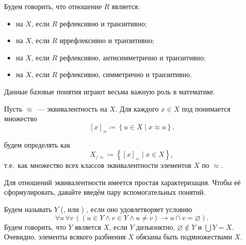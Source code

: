 \begin{definition*}
    Будем говорить, что отношение $R$ является:
    \begin{itemize}
        \item {} на $X$, если $R$ рефлексивно и транзитивно;
        \item {} на $X$, если $R$ иррефлексивно и транзитивно;
        \item {} на $X$, если $R$ рефлексивно, антисимметрично и транзитивно;
        \item {} на $X$, если $R$ рефлексивно, симметрично и транзитивно.
    \end{itemize}
    Данные базовые понятия играют весьма важную роль в математике.
\end{definition*}

\begin{definition*}
    Пусть $\approx$~--- эквивалентность на $X$. Для каждого $x \in X$ под  понимается множество
    $$
    {\left[ x \right]}_{\approx} \coloneqq {\left\{ u \in X \mid {x \approx u} \right\}}.
    $$

     будем определять как
    $$
        X_{/\approx} \coloneqq {\left\{ {\left[ x \right]}_{\approx} \mid x \in X \right\}},
    $$
    т.е.\ как множество всех классов эквивалентности элементов $X$ по $\approx$.
\end{definition*}


Для отношений эквивалентности имеется простая характеризация. Чтобы её сформулировать, давайте введём
пару вспомогательных понятий.
\begin{definition*}
    Будем называть $Y$ (, или ) , если оно
    удовлетворяет условию
    \[
        {\forall u}\, {\forall v}\, {\left( \left( {u \in Y} \wedge {v \in Y} \wedge {u \ne v} \right)
              \rightarrow {u \cap v = \varnothing} \right)} .
    \]
    Будем говорить, что $Y$ является  $X$, если $Y$ дизъюнктно, $\varnothing \not \in Y$
    и $\bigcup Y = X$. Очевидно, элементы всякого разбиения $X$ обязаны быть подмножествами $X$.
\end{definition*}







